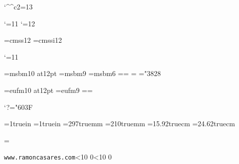 
\catcode`\^^c2=13
\ifx\index\undefined  \fi

\catcode`\@=11
\let\utf=\relax
\let\utf@Ch=\relax
\let\stringate=\relax
\let\dohigh=\relax
\let\doaccents=\relax
\let\dosymbols=\relax
\let\deactivate=\relax
\def\stringaccents{\def\'{\string\'}\def\~{\string\~}%
 \def\"{\string\"}\def\`{\string\`}\def\^{\string\^}}
\catcode`\@=12

\files


\ifx\loadfont\undefined  \fi
\xiifonts \xiititles \rm
\font\sf=cmss12
\font\sfit=cmssi12

\catcode`\@=11

\font\xiibb=msbm10 at12pt
\font\ixbb=msbm9
\font\vibb=msbm6
\newfam\bbfam %
\textfont\bbfam=\xiibb \scriptfont\bbfam=\ixbb
\scriptscriptfont\bbfam=\vibb
\def\bb{\fam\bbfam\xiibb}
\mathchardef\subsetneq="3828

\font\xiifrak=eufm10 at12pt
\font\ixfrak=eufm9
\newfam\frakfam \textfont\frakfam=\xiifrak \scriptfont\frakfam=\ixfrak
\def\frak{\fam\frakfam\xiifrak}

\mathcode`?="603F %
\def\ifmath$#1${\relax\ifmmode #1\else$#1$\fi}
\def\QED{\ifmath$\diamond$}


\ifcase\pdfoutput\else
 \pdfhorigin=1truein
 \pdfvorigin=1truein
 \pdfpageheight=297truemm
 \pdfpagewidth=210truemm
\fi
\hsize=15.92truecm \vsize=24.62truecm %
\advance\vsize -30pt

\def\twodigits#1{\ifnum #1<10 0\fi \number#1}
\def\todayiso{\number\year \twodigits\month \twodigits\day}
\def\Folio{\ifnum\pageno<0
 \uppercase\expandafter{\romannumeral-\pageno}\else\number\pageno\fi}

\headline={\strut{\tt www.ramoncasares.com}\quad \todayiso \hfil
 \quad{\bf \jobname}\quad {\bf\Folio}}%
\def\makeheadline{\vbox to 30pt{\line{\the\headline}%
  \kern 1pt \hrule height 1pt\vfil}\nointerlineskip}
\nopagenumbers


\newcount\secno
\newcount\ssecno
\newcount\thno
\newcount\parno
\let\presec=\empty

\parskip=0pt
\newdimen\oldparindent \oldparindent=20pt \parindent=0pt
\def\hang{\hangindent\oldparindent}

\def\numberedpars{\global\advance\parno1 %
 \noindent\hbox to\oldparindent{{\xiiscriptsy\char123
  \xiiscriptrm\number\parno}\hfil$\cdot$\hfil}\ignorespaces}

